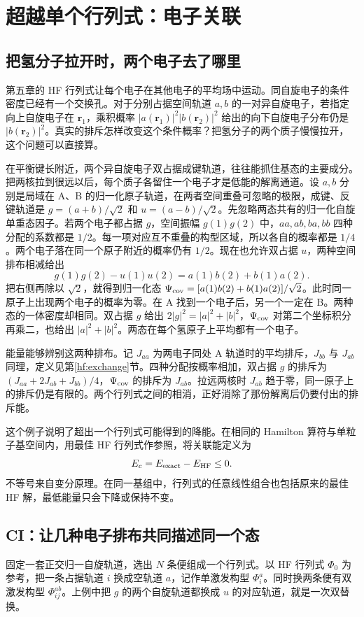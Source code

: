 \chapter{超越单个行列式：电子关联}
\section{把氢分子拉开时，两个电子去了哪里}\label{corr:h2-dissociation}
第五章的 HF 行列式让每个电子在其他电子的平均场中运动。同自旋电子的条件密度已经有一个交换孔。对于分别占据空间轨道 $a,b$ 的一对异自旋电子，若指定向上自旋电子在 $\bm r_1$，乘积概率 $|a(\bm r_1)|^2|b(\bm r_2)|^2$ 给出的向下自旋电子分布仍是 $|b(\bm r_2)|^2$。真实的排斥怎样改变这个条件概率？把氢分子的两个质子慢慢拉开，这个问题可以直接算。

在平衡键长附近，两个异自旋电子双占据成键轨道，往往能抓住基态的主要成分。把两核拉到很远以后，每个质子各留住一个电子才是低能的解离通道。设 $a,b$ 分别是局域在 A、B 的归一化原子轨道，在两者空间重叠可忽略的极限，成键、反键轨道是 $g=(a+b)/\sqrt2$ 和 $u=(a-b)/\sqrt2$。先忽略两态共有的归一化自旋单重态因子。若两个电子都占据 $g$，空间振幅 $g(1)g(2)$ 中，$aa,ab,ba,bb$ 四种分配的系数都是 $1/2$。每一项对应互不重叠的构型区域，所以各自的概率都是 $1/4$。两个电子落在同一个原子附近的概率仍有 $1/2$。现在也允许双占据 $u$，两种空间排布相减给出
\[
 g(1)g(2)-u(1)u(2)=a(1)b(2)+b(1)a(2).
\]
把右侧再除以 $\sqrt2$，就得到归一化态 $\Psi_{\rm cov}=[a(1)b(2)+b(1)a(2)]/\sqrt2$。此时同一原子上出现两个电子的概率为零。在 A 找到一个电子后，另一个一定在 B。两种态的一体密度却相同。双占据 $g$ 给出 $2|g|^2=|a|^2+|b|^2$，$\Psi_{\rm cov}$ 对第二个坐标积分再乘二，也给出 $|a|^2+|b|^2$。两态在每个氢原子上平均都有一个电子。

能量能够辨别这两种排布。记 $J_{aa}$ 为两电子同处 A 轨道时的平均排斥，$J_{bb}$ 与 $J_{ab}$ 同理，定义见第\ref{hf:exchange}节。四种分配按概率相加，双占据 $g$ 的排斥为 $(J_{aa}+2J_{ab}+J_{bb})/4$，$\Psi_{\rm cov}$ 的排斥为 $J_{ab}$。拉远两核时 $J_{ab}$ 趋于零，同一原子上的排斥仍是有限的。两个行列式之间的相消，正好消除了那份解离后仍要付出的排斥能。

这个例子说明了超出一个行列式可能得到的降能。在相同的 Hamilton 算符与单粒子基空间内，用最佳 HF 行列式作参照，将关联能定义为
\begin{equation}
 E_c=E_{\rm exact}-E_{\rm HF}\le0 .
\end{equation}
不等号来自变分原理。在同一基组中，行列式的任意线性组合也包括原来的最佳 HF 解，最低能量只会下降或保持不变。

\section{CI：让几种电子排布共同描述同一个态}
固定一套正交归一自旋轨道，选出 $N$ 条便组成一个行列式。以 HF 行列式 $\Phi_0$ 为参考，把一条占据轨道 $i$ 换成空轨道 $a$，记作单激发构型 $\Phi_i^a$。同时换两条便有双激发构型 $\Phi_{ij}^{ab}$。上例中把 $g$ 的两个自旋轨道都换成 $u$ 的对应轨道，就是一次双替换。

